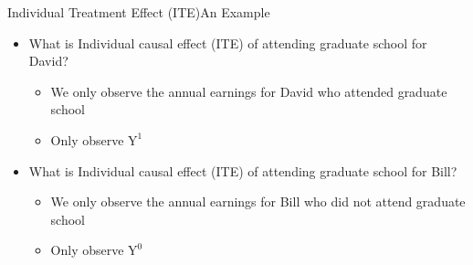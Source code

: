 \documentclass[hyperref={pdfpagelabels=false}]{beamer}
\begin{document}
\begin{frame}{Individual Treatment Effect (ITE)}{An Example}
\begin{itemize}
\item What is Individual causal effect (ITE) of attending graduate school for David?
\vspace{0.2cm}
\begin{itemize}

\item We only observe the annual earnings for David who attended graduate school
\vspace{0.2cm}
\item Only observe $\mathrm{Y}^{1}$
\vspace{0.2cm}
\end{itemize}

\item What is Individual causal effect (ITE) of attending graduate school for Bill?
\vspace{0.2cm}
\begin{itemize}
\item We only observe the annual earnings for Bill who did not attend graduate school
\vspace{0.2cm}
\item Only observe $\mathrm{Y}^{0}$
\end{itemize}

\end{itemize}
\end{frame}
\end{document}
